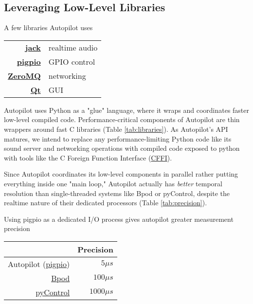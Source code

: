 \subsection{Leveraging Low-Level Libraries}
\label{sec:lowlevel}

\begin{margintable}[1.85cm]
\caption{A few libraries Autopilot uses}
\label{tab:libraries}
\noindent\begin{tabularx}{\linewidth}{rX}
\toprule
 \textbf{\href{http://jackaudio.org/}{jack}} & realtime audio \\
 \textbf{\href{http://abyz.me.uk/rpi/pigpio/index.html}{pigpio}} & GPIO control \\
 \textbf{\href{http://zeromq.org/}{ZeroMQ}} & networking \\
 \textbf{\href{https://www.qt.io/}{Qt}} & GUI \\
 \bottomrule
\end{tabularx}
\end{margintable}

Autopilot uses Python as a "glue" language, where it wraps and coordinates faster low-level compiled code\citep{vanrossumGlueItAll1998}.  
Performance-critical components of Autopilot are thin wrappers around fast C libraries (Table \ref{tab:libraries}). As Autopilot's API matures, we intend to replace any performance-limiting Python code like its sound server and networking operations with compiled code exposed to python with tools like the C Foreign Function Interface (\href{https://cffi.readthedocs.io/en/latest/index.html}{CFFI}).

Since Autopilot coordinates its low-level components in parallel rather putting everything inside one "main loop," Autopilot actually has \textit{better} temporal resolution than  single-threaded systems like Bpod or pyControl, despite the realtime nature of their dedicated processors (Table \ref{tab:precision}).

\begin{margintable}
\caption{Using pigpio as a dedicated I/O process gives autopilot greater measurement precision}
\label{tab:precision}
\noindent\begin{tabularx}{\linewidth}{rR}\toprule
& Precision \\
\midrule
Autopilot (\href{http://abyz.me.uk/rpi/pigpio/pigpiod.html}{pigpio}) & $5\mu s$ \\
\href{https://github.com/sanworks/Bpod_StateMachine_Firmware/blob/059d1e9195f5bb7d0d5cd7b33f56342eb5a3a55c/Dev/StateMachineFirmware/StateMachineFirmware.ino\#L196}{Bpod} & $100\mu s$ \\
\href{https://github.com/pyControl/code/blob/28cf5ea28ca2764aeea829eba148adfa5239254a/pyControl/framework.py\#L228}{pyControl} & $1000\mu s$ \\
\bottomrule
\end{tabularx}
\end{margintable}